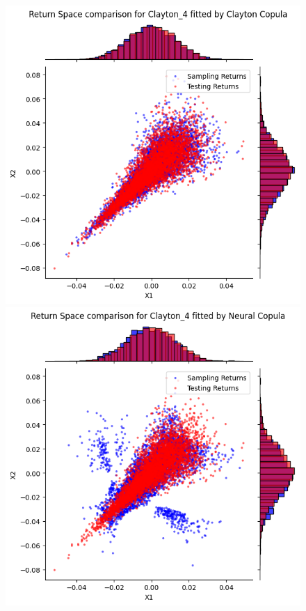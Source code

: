 \begin{figure}
\begin{minipage}{0.4\textwidth}
    \end{minipage}
    \vfill
    \begin{minipage}{0.4\textwidth}
        \centering
        \includegraphics[width=\textwidth]{5ResultsDiscussion/pictures/PortfolioTest/ResultPortfolio4Clayton.png}
    \end{minipage}
    \hfill
    \begin{minipage}{0.4\textwidth}
        \centering
        \includegraphics[width=\textwidth]{5ResultsDiscussion/pictures/PortfolioTest/ResultPortfolio4Neural.png}

\end{minipage}
\end{figure}
